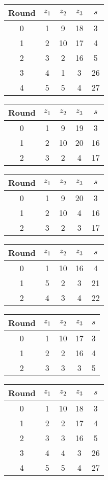 \begin{tabular}{c | c | c | c | c }
Round & $z_1$ & $z_2$ & $z_3$ & $s$ \\
\hline
0 & 1 & 9 & 18 & 3 \\
1 & 2 & 10 & 17 & 4 \\
2 & 3 & 2 & 16 & 5 \\
3 & 4 & 1 & 3 & 26 \\
4 & 5 & 5 & 4 & 27
\end{tabular}

\begin{tabular}{c | c | c | c | c }
Round & $z_1$ & $z_2$ & $z_3$ & $s$ \\
\hline
0 & 1 & 9 & 19 & 3 \\
1 & 2 & 10 & 20 & 16 \\
2 & 3 & 2 & 4 & 17
\end{tabular}

\begin{tabular}{c | c | c | c | c }
Round & $z_1$ & $z_2$ & $z_3$ & $s$ \\
\hline
0 & 1 & 9 & 20 & 3 \\
1 & 2 & 10 & 4 & 16 \\
2 & 3 & 2 & 3 & 17
\end{tabular}

\begin{tabular}{c | c | c | c | c }
Round & $z_1$ & $z_2$ & $z_3$ & $s$ \\
\hline
0 & 1 & 10 & 16 & 4 \\
1 & 5 & 2 & 3 & 21 \\
2 & 4 & 3 & 4 & 22
\end{tabular}

\begin{tabular}{c | c | c | c | c }
Round & $z_1$ & $z_2$ & $z_3$ & $s$ \\
\hline
0 & 1 & 10 & 17 & 3 \\
1 & 2 & 2 & 16 & 4 \\
2 & 3 & 3 & 3 & 5
\end{tabular}

\begin{tabular}{c | c | c | c | c }
Round & $z_1$ & $z_2$ & $z_3$ & $s$ \\
\hline
0 & 1 & 10 & 18 & 3 \\
1 & 2 & 2 & 17 & 4 \\
2 & 3 & 3 & 16 & 5 \\
3 & 4 & 4 & 3 & 26 \\
4 & 5 & 5 & 4 & 27
\end{tabular}

